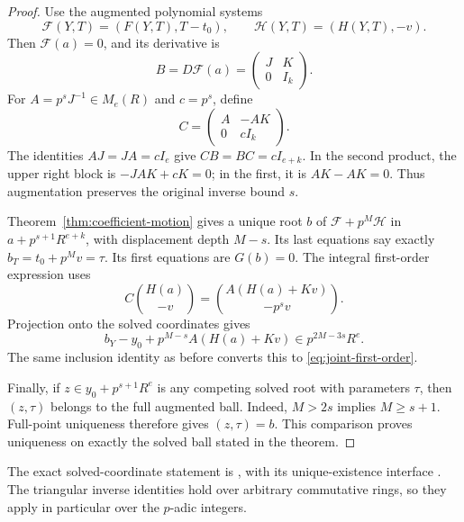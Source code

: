 \begin{proof}
Use the augmented polynomial systems
\[
 \mathcal F(Y,T)=(F(Y,T),T-t_0),\qquad
 \mathcal H(Y,T)=(H(Y,T),-v).
\]
Then $\mathcal F(a)=0$, and its derivative is
\[
 B=D\mathcal F(a)=\begin{pmatrix}J&K\\0&I_k\end{pmatrix}.
\]
For $A=p^sJ^{-1}\in M_e(R)$ and $c=p^s$, define
\[
 C=\begin{pmatrix}A&-AK\\0&cI_k\end{pmatrix}.
\]
The identities $AJ=JA=cI_e$ give $CB=BC=cI_{e+k}$. In the second
product, the upper right block is $-JAK+cK=0$; in the first, it is
$AK-AK=0$. Thus augmentation preserves the original inverse bound $s$.

Theorem~\ref{thm:coefficient-motion} gives a unique root $b$ of
$\mathcal F+p^M\mathcal H$ in $a+p^{s+1}R^{e+k}$, with displacement
depth $M-s$. Its last equations say exactly
$b_T=t_0+p^Mv=\tau$. Its first equations are $G(b)=0$.
The integral first-order expression uses
\[
 C\binom{H(a)}{-v}
 =\binom{A(H(a)+Kv)}{-p^sv}.
\]
Projection onto the solved coordinates gives
\[
 b_Y-y_0+p^{M-s}A(H(a)+Kv)\in p^{2M-3s}R^e.
\]
The same inclusion identity as before converts this to
\eqref{eq:joint-first-order}.

Finally, if $z\in y_0+p^{s+1}R^e$ is any competing solved root with
parameters $\tau$, then $(z,\tau)$ belongs to the full augmented ball.
Indeed, $M>2s$ implies $M\ge s+1$. Full-point uniqueness therefore gives
$(z,\tau)=b$. This comparison proves uniqueness on exactly the solved
ball stated in the theorem.
\end{proof}

The exact solved-coordinate statement is
,
with its unique-existence interface
.
The triangular inverse identities hold over arbitrary commutative rings,
so they apply in particular over the $p$-adic integers.

